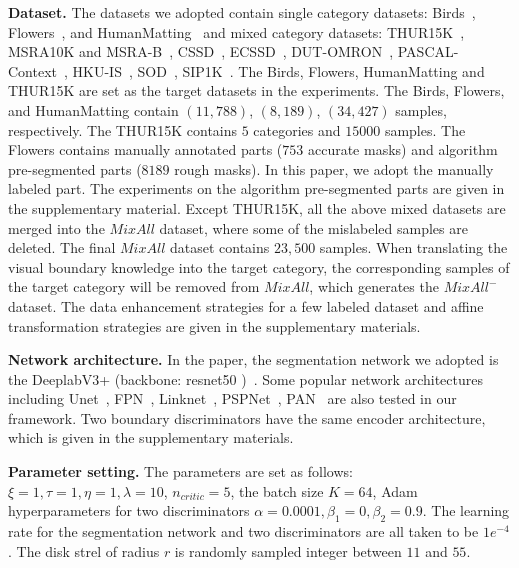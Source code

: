 \documentclass[letterpaper]{article} %
\begin{document}
\textbf{Dataset.} The datasets we adopted contain single category datasets: Birds~\citep{Birds_datasets}, Flowers~\citep{nilsback2007delving}, and HumanMatting~\citep{Matting_human_datasets} and mixed category datasets: THUR15K~\citep{ChengGroupSaliency}, MSRA10K and MSRA-B~\citep{cheng2011global,hou2017deeply}, CSSD~\citep{yan2013hierarchical}, ECSSD~\citep{shi2016hierarchical}, DUT-OMRON~\citep{DUT_OMRON_datasets}, PASCAL-Context~\citep{mottaghi2014the}, HKU-IS~\citep{li2016visual}, SOD~\citep{movahedi2010design}, SIP1K~\citep{fan2019rethinking}.
The Birds, Flowers, HumanMatting and THUR15K are set as the target datasets in the experiments.  The Birds, Flowers, and HumanMatting contain $(11,788)$, $(8,189)$, $(34,427)$ samples, respectively.
The THUR15K contains $5$ categories and $15000$ samples.
The Flowers contains manually annotated parts ($753$ accurate masks) and algorithm~\citep{nilsback2007delving} pre-segmented parts ($8189$ rough masks).
In this paper, we adopt the manually labeled part. The experiments on the algorithm pre-segmented parts are given in the supplementary material. Except THUR15K, all the above mixed datasets are merged into the $MixAll$ dataset, where some of the mislabeled samples are deleted. The final $MixAll$ dataset contains $23,500$ samples.  When translating the visual boundary knowledge into the target category, the corresponding samples of the target category will be removed from $MixAll$, which generates the  $MixAll^{-}$ dataset. The data enhancement strategies for a few labeled dataset and affine transformation strategies are given in the supplementary materials.

\textbf{Network architecture.} In the paper, the segmentation network we adopted is the DeeplabV3+ (backbone: resnet50 )~\citep{chen2017rethinking}. Some popular network architectures including Unet~\citep{ronneberger2015u-net:}, FPN~\citep{lin2017feature}, Linknet~\citep{chaurasia2017linknet:}, PSPNet~\citep{zhao2017pyramid}, PAN~\citep{li2018pyramid} are also tested in our framework. Two boundary discriminators have the same encoder architecture, which is given in the supplementary materials.


\textbf{Parameter setting.} The parameters are set as follows: $\xi=1, \tau =1,\eta =1, \lambda = 10$, $n_{critic}=5$, the batch size $K =64$, Adam hyperparameters for two discriminators $\alpha =0.0001,\beta_{1}=0,\beta_{2}=0.9$. The learning rate for the segmentation network and two discriminators are all taken to be  $1e^{-4}$. The disk strel of radius $r$ is randomly sampled integer between $11$ and $55$.
\end{document}
